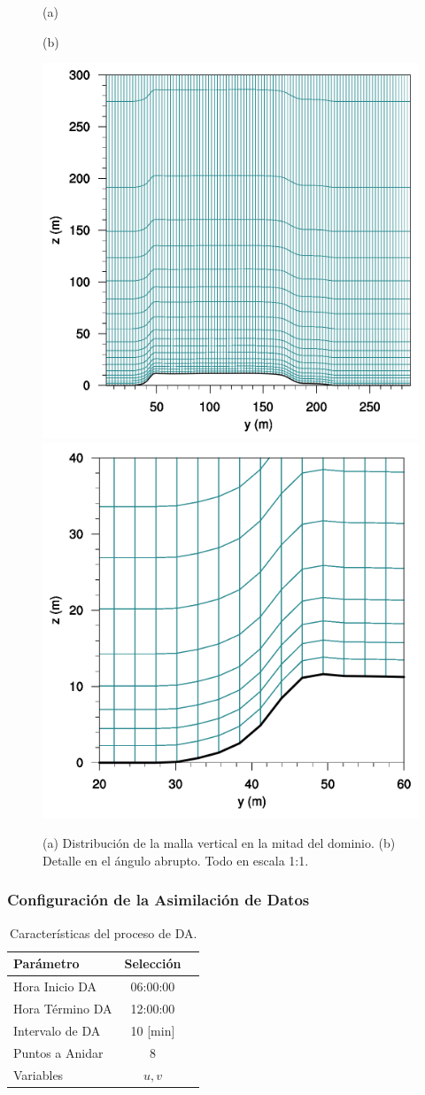 \begin{figure}[H]
	\centering
	\begin{minipage}{0.5\linewidth}
		\center\hspace{1.8cm}(a)
	\end{minipage}%
	\begin{minipage}{0.5\linewidth}
		\center(b)
	\end{minipage}%
	
	\includegraphics[width=0.45\linewidth,trim={0cm 0cm -0cm 0cm},clip]{Imagenes/05/mesh_y50}%
	\includegraphics[width=0.45\linewidth,trim={0cm 0cm 0cm 0cm},clip]{Imagenes/05/hd_mesh_50}%
	
	\caption{(a) Distribución de la malla vertical en la mitad del dominio. (b) Detalle en el ángulo abrupto. Todo en escala 1:1.}
	\label{fig:05_mesh_bol}
\end{figure}

\subsubsection{Configuración de la Asimilación de Datos}

\begin{table}[h!]
	\caption{Características del proceso de DA.}\label{tab:05_config_da_bol}
	\centering\footnotesize
	\begin{tabular}{lcc}
		\toprule
		Parámetro & Selección \\
		\midrule
		Hora Inicio	DA 	 & 06:00:00   \\
		Hora Término DA	 		 & 12:00:00  \\
		Intervalo de DA	&	10 [min] \\
		Puntos a Anidar	 	 & 8   \\
		Variables	& $u,v$   \\
		\bottomrule
	\end{tabular}
\end{table}

